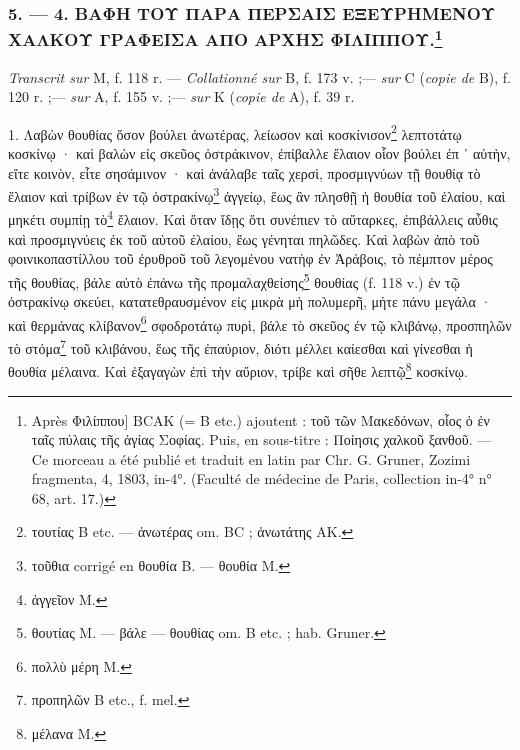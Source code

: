 \documentclass[a4paper, 11pt, oneside, polutonikogreek, french]{article}
\begin{document}
\bigskip
\centerline{\EightStarTaper}
\centerline{\EightStarTaper\EightStarTaper}
\bigskip

\subsubsection[5. --- 4. ΒΑΦΗ ΤΟΥ ΠΑΡΑ ΠΕΡΣΑΙΣ ΕΞΕΥΡΗΜΕΝΟΥ ΧΑΛΚΟΥ ΓΡΑΦΕΙΣΑ ΑΠΟ ΑΡΧΗΣ ΦΙΛΙΠΠΟΥ.]{5. --- 4. ΒΑΦΗ ΤΟΥ ΠΑΡΑ ΠΕΡΣΑΙΣ ΕΞΕΥΡΗΜΕΝΟΥ ΧΑΛΚΟΥ ΓΡΑΦΕΙΣΑ ΑΠΟ ΑΡΧΗΣ ΦΙΛΙΠΠΟΥ.\footnote{Après Φιλίππου] BCAK (= B etc.) ajoutent : τοῦ τῶν Μακεδόνων, οἷος ὁ ἐν ταῖς πύλαις τῆς ἀγίας Σοφίας. Puis, en sous-titre : Ποίησις χαλκοῦ ξανθοῦ. --- Ce morceau a été publié et traduit en latin par Chr. G. Gruner, Zozimi fragmenta, 4, 1803, in-4°. (Faculté de médecine de Paris, collection in-4° n° 68, art. 17.)}}

\emph{Transcrit sur} M, f. 118 r. --- \emph{Collationné sur} B, f. 173 v. ;--- \emph{sur} C (\emph{copie de} B), f. 120 r. ;--- \emph{sur} A, f. 155 v. ;--- \emph{sur} K (\emph{copie de} A), f. 39 r.

\bigskip

1. Λαβὼν θουθίας ὅσον βούλει ἀνωτέρας, λείωσον καὶ κοσκίνισον\footnote{τουτίας B etc. --- ἀνωτέρας om. BC ; ἀνωτάτης AK.} λεπτοτάτῳ κοσκίνῳ · καὶ βαλὼν εἰς σκεῦος ὀστράκινον, ἐπίβαλλε ἔλαιον οἷον βούλει ἐπ ᾽ αὐτὴν, εἴτε κοινὸν, εἶτε σησάμινον · καὶ ἀνάλαβε ταῖς χερσὶ, προσμιγνύων τῇ θουθίᾳ τὸ ἔλαιον καὶ τρίβων ἐν τῷ ὀστρακίνῳ\footnote{τοῦθια corrigé en θουθία B. --- θουθία M.} ἀγγείῳ, ἕως ἂν πλησθῇ ἡ θουθία τοῦ ἐλαίου, καὶ μηκέτι συμπίῃ τὸ\footnote{ἀγγεῖον M.} ἔλαιον. Καὶ ὅταν ἴδῃς ὅτι συνέπιεν τὸ αὔταρκες, ἐπιβάλλεις αὖθις καὶ προσμιγνύεις ἐκ τοῦ αὐτοῦ ἐλαίου, ἕως γένηται πηλῶδες. Καὶ λαβὼν ἀπὸ τοῦ φοινικοπαστίλλου τοῦ ἐρυθροῦ τοῦ λεγομένου νατὴφ ἐν Ἀράβοις, τὸ πέμπτον μέρος τῆς θουθίας, βάλε αὐτὸ ἐπάνω τῆς προμαλαχθείσης\footnote{θουτίας M. --- βάλε --- θουθίας om. B etc. ; hab. Gruner.} θουθίας (f. 118 v.) ἐν τῷ ὀστρακίνῳ σκεύει, κατατεθραυσμένον εἰς μικρὰ μὴ πολυμερῆ, μήτε πάνυ μεγάλα · καὶ θερμάνας κλίβανον\footnote{πολλὺ μέρη M.} σφοδροτάτῳ πυρὶ, βάλε τὸ σκεῦος ἐν τῷ κλιβάνῳ, προσπηλῶν τὸ στόμα\footnote{προπηλῶν B etc., f. mel.} τοῦ κλιβάνου, ἕως τῆς ἐπαύριον, διότι μέλλει καίεσθαι καὶ γίνεσθαι ἡ θουθία μέλαινα. Καὶ ἐξαγαγὼν ἐπὶ τὴν αὔριον, τρίβε καὶ σῆθε λεπτῷ\footnote{μέλανα M.} κοσκίνῳ.
\end{document}

